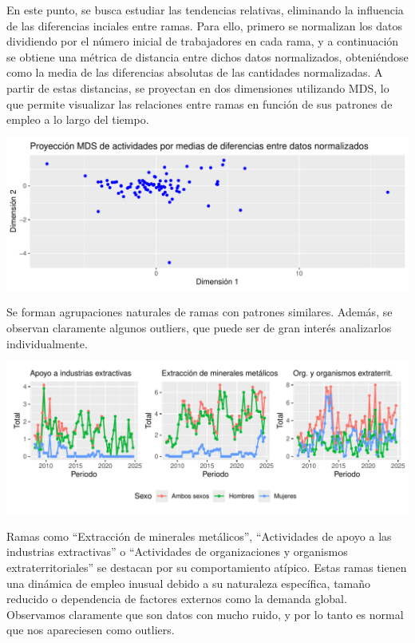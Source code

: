 \documentclass[notspecified,article,submit,moreauthors,pdftex]{Definitions/mdpi}
\begin{document}
En este punto, se busca estudiar las tendencias relativas, eliminando la
influencia de las diferencias inciales entre ramas. Para ello, primero
se normalizan los datos dividiendo por el número inicial de trabajadores
en cada rama, y a continuación se obtiene una métrica de distancia entre
dichos datos normalizados, obteniéndose como la media de las diferencias
absolutas de las cantidades normalizadas. A partir de estas distancias,
se proyectan en dos dimensiones utilizando MDS, lo que permite
visualizar las relaciones entre ramas en función de sus patrones de
empleo a lo largo del tiempo.

\includegraphics{ProyectoAED2024_files/figure-latex/unnamed-chunk-42-1.pdf}

Se forman agrupaciones naturales de ramas con patrones similares.
Además, se observan claramente algunos outliers, que puede ser de gran
interés analizarlos individualmente.

\includegraphics{ProyectoAED2024_files/figure-latex/unnamed-chunk-43-1.pdf}

Ramas como ``Extracción de minerales metálicos'', ``Actividades de apoyo
a las industrias extractivas'' o ``Actividades de organizaciones y
organismos extraterritoriales'' se destacan por su comportamiento
atípico. Estas ramas tienen una dinámica de empleo inusual debido a su
naturaleza específica, tamaño reducido o dependencia de factores
externos como la demanda global. Observamos claramente que son datos con
mucho ruido, y por lo tanto es normal que nos apareciesen como outliers.
\end{document}
